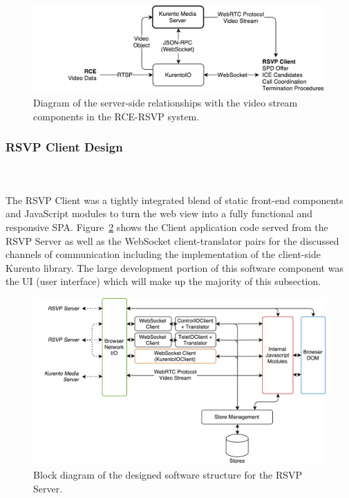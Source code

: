           \begin{figure}
            \centering
            \includegraphics[width=0.8\linewidth]{figures/softDesign-serverSideKurento}
            \caption[Diagram of the server-side relationships with the video stream components in the RCE-RSVP system.]{Diagram of the server-side relationships with the video stream components in the RCE-RSVP system.}
            \label{fig:softDesign-serverSideKurento}
          \end{figure}
          
          
    \subsubsection{RSVP Client Design}
      \\\\
        The RSVP Client was a tightly integrated blend of static front-end components and JavaScript modules to turn the web view into a fully functional and responsive SPA. Figure~\ref{fig:softDesign-clientStructurePlan} shows the Client application code served from the RSVP Server as well as the WebSocket client-translator pairs for the discussed channels of communication including the implementation of the client-side Kurento library. The large development portion of this software component was the UI (user interface) which will make up the majority of this subsection.
        
        \begin{figure}[h!]
          \centering
          \includegraphics[width=1\linewidth]{figures/softDesign-clientStructurePlan}
          \caption[Block diagram of the designed software structure for the RSVP Server.]{Block diagram of the designed software structure for the RSVP Server.}
          \label{fig:softDesign-clientStructurePlan}
        \end{figure}
        
